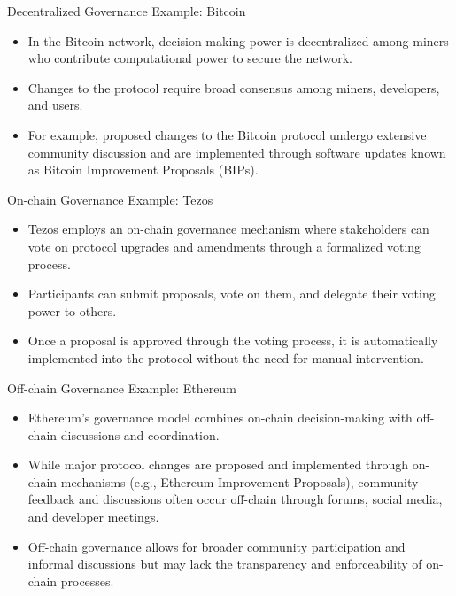 \begin{frame}{Decentralized Governance Example: Bitcoin}
    \begin{itemize}
        \item In the Bitcoin network, decision-making power is decentralized among miners who contribute computational power to secure the network.
        \item Changes to the protocol require broad consensus among miners, developers, and users.
        \item For example, proposed changes to the Bitcoin protocol undergo extensive community discussion and are implemented through software updates known as Bitcoin Improvement Proposals (BIPs).
    \end{itemize}
\end{frame}

\begin{frame}{On-chain Governance Example: Tezos}
    \begin{itemize}
        \item Tezos employs an on-chain governance mechanism where stakeholders can vote on protocol upgrades and amendments through a formalized voting process.
        \item Participants can submit proposals, vote on them, and delegate their voting power to others.
        \item Once a proposal is approved through the voting process, it is automatically implemented into the protocol without the need for manual intervention.
    \end{itemize}
\end{frame}

\begin{frame}{Off-chain Governance Example: Ethereum}
    \begin{itemize}
        \item Ethereum's governance model combines on-chain decision-making with off-chain discussions and coordination.
        \item While major protocol changes are proposed and implemented through on-chain mechanisms (e.g., Ethereum Improvement Proposals), community feedback and discussions often occur off-chain through forums, social media, and developer meetings.
        \item Off-chain governance allows for broader community participation and informal discussions but may lack the transparency and enforceability of on-chain processes.
    \end{itemize}
\end{frame}

